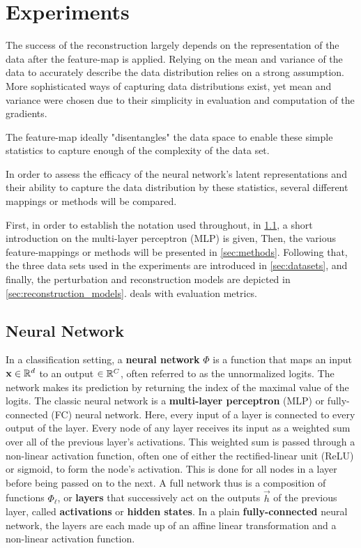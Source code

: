 
\chapter{Experiments}
\label{chap:Experiments} 

The success of the reconstruction largely depends on the representation of the data
after the feature-map is applied.
Relying on the mean and variance of the data to accurately describe the data distribution 
relies on a strong assumption.
More sophisticated ways of capturing data distributions exist, yet mean and variance were chosen due to their simplicity in evaluation and computation of the gradients.

The feature-map ideally "disentangles" the data space to enable 
these simple statistics to capture enough of the complexity of the data set.

In order to assess the efficacy of the neural network's latent representations 
and their ability to capture the data distribution by these statistics,
several different mappings or methods will be compared. 

First, in order to establish the notation used throughout, in \cref{sec:nn_def}, 
a short introduction on the multi-layer perceptron (MLP) is given,
Then, the various feature-mappings or methods will be presented in \cref{sec:methods}.
Following that, the three data sets used in the experiments are introduced in \cref{sec:datasets},
and finally, the perturbation and reconstruction models are depicted in \cref{sec:reconstruction_models}.
 deals with evaluation metrics.

\section{Neural Network}
\label{sec:nn_def}

In a classification setting, a \textbf{neural network} $\Phi$ is a function that maps an input $\mathbf x \in \mathbb{R}^d$ to an output $\in \mathbb{R}^C$,
often referred to as the unnormalized logits. 
The network makes its prediction by returning the index of the maximal value of the logits.
The classic neural network is a \textbf{multi-layer perceptron} (MLP) or fully-connected (FC) neural network.
Here, every input of a layer is connected to every output of the layer.
Every node of any layer receives its input as a weighted sum over all of the previous layer's activations.
This weighted sum is passed through a non-linear activation function, often one of either the rectified-linear unit (ReLU) or sigmoid, to form the node's activation. 
This is done for all nodes in a layer before being passed on to the next.
A full network thus is a composition of functions $\Phi_\ell$, or \textbf{layers} that 
successively act on the outputs $\vec h$ of the previous layer, called \textbf{activations} or \textbf{hidden states}. 
In a plain \textbf{fully-connected} neural network, the layers are each made up of an affine linear transformation and a non-linear activation function.

